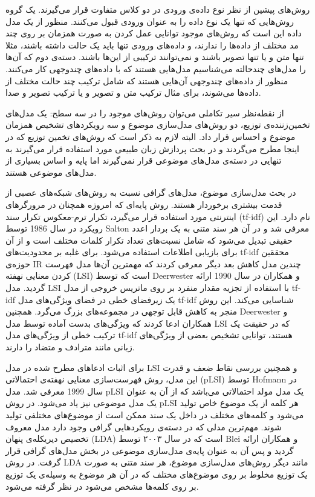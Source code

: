 \documentclass[12pt,a4paper]{article}
\begin{document}
روش‌های پیشین از نظر نوع داده‌ی ورودی در دو کلاس متفاوت قرار می‌‌گیرند. یک گروه روش‌هایی که تنها یک نوع داده را به عنوان ورودی قبول می‌‌کنند. منظور از یک مدل داده این است که روش‌های موجود توانایی عمل کردن به صورت همزمان بر روی چند مد مختلف از داده‌ها را ندارند، و داده‌های ورودی تنها باید یک حالت داشته باشند، مثلا تنها متن و یا تنها تصویر باشند و نمی‌‌توانند ترکیبی‌ از این‌ها باشند. دسته‌ی دوم که آن‌ها را مدل‌های چندحالته می‌‌شناسیم مدل‌هایی هستند که با داده‌های چندوجهی کار می‌‌کنند. منظور از داده‌های چندوجهی آن‌هایی هستند که شامل ترکیب چند حالت مختلف از داد‌ه‌ها می‌شوند، برای مثال ترکیب متن و تصویر و یا ترکیب تصویر و صدا. 

از نقطه‌نظر سیر تکاملی می‌‌توان روش‌های موجود را در سه‌ سطح: یک مدل‌های تخمین‌زننده‌ی توزیع، دو روش‌های مدل‌سازی موضوع و سه رویکردهای تشخیص همزمان موضوع و احساس قرار داد. البته لازم به ذکر است که روش‌های تخمین توزیع که در اینجا مطرح می‌‌گردند و در بحث پردازش زبان طبیعی مورد استفاده قرار می‌‌گیرند به تنهایی در دسته‌ی مدل‌های موضوعی قرار نمی‌‌گیرند اما پایه و اساس بسیاری از مدل‌های موضوعی هستند.

در بحث مدل‌سازی موضوع، مدل‌های گرافی‌ نسبت به روش‌های شبکه‌های عصبی از قدمت بیشتری برخوردار هستند. روش پایه‌‌ای که امروزه همچنان در مرورگر‌های اینترنتی مورد استفاده قرار می‌‌گیرد، تکرار ترم-معکوس تکرار سند (tf-idf) نام دارد. این رویکرد در سال 1986 توسط Salton معرفی شد و در آن هر سند متنی به یک بردار اعدد حقیقی‌ تبدیل می‌شود که شامل نسبت‌های تعداد تکرار کلمات مختلف است و از آن برای بازیابی اطلاعات استفاده می‌شود. برای غلبه بر محدودیت‌های tf-idf محققین حوزه‌ی IR چندین مدل کاهش بعد دیگر معرفی‌ کردند که مهمترین آن‌ها مدل فهرست کردن معنایی نهفته (LSI) است که توسط Deerwester و همکاران در سال 1990 ارائه گردید. مدل LSI با استفاده از تجزیه مقدار منفرد بر روی ماتریس خروجی از مدل tf-idf یک زیرفضای خطی در فضای ویژگی‌‌های مدل tf-idf شناسایی می‌‌کند.  این روش منجر به کاهش  قابل توجهی‌ در مجموعه‌های بزرگ می‌‌گرد. همچنین Deerwester و همکاران ادعا کردند که ویژگی‌‌های بدست آماده توسط مدل LSI
که در حقیقت یک ترکیب خطی‌ از ویژگی‌‌های مدل tf-idf هستند، توانایی تشخیص بعضی‌ از ویژگی‌‌های زبانی مانند مترادف و متضاد را دارند.

برای اثبات ادعا‌های مطرح شده در مدل LSI و همچنین بررسی‌ نقاط ضعف و قدرت این مدل، روش فهرست‌سازی معنایی نهفته‌ی احتمالاتی (pLSI) 
توسط Hofmann در سال 1999 معرفی شد. مدل pLSI یک مدل مولد احتمالاتی می‌باشد که از آن به عنوان یک مدل موضوعی نیز یاد می‌شود. در روش pLSI هر کلمه از یک موضوع خاص تولید می‌‌شود و کلمه‌های مختلف در داخل یک سند ممکن است از موضوع‌های مختلفی‌ تولید شوند. مهم‌ترین مدلی‌ که در دسته‌‌ی  رویکردهایی گرافی وجود دارد مدل معروف تخصیص دیریکله‌ی پنهان (LDA) است که در سال ۲۰۰۳ توسط Blei و همکاران 
ارائه گردید و پس آن به عنوان پایه‌ی مدل‌سازی موضوعی در بخش مدل‌های گرافی قرار گرفت. در روش  LDA مانند دیگر روش‌های مدل‌سازی موضوع، هر سند متنی به صورت یک توزیع مخلوط بر روی موضوع‌های مختلف‌ که در آن هر موضوع به وسیله‌ی یک توزیع بر روی کلمه‌ها مشخص می‌‌شود در نظر گرفته می‌شود.
\end{document}
